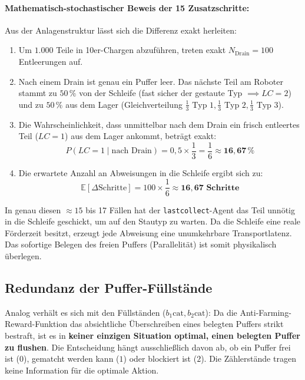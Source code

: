 \documentclass[11pt,a4paper]{article}
\begin{document}
\paragraph{Mathematisch-stochastischer Beweis der 15 Zusatzschritte:}
Aus der Anlagenstruktur lässt sich die Differenz exakt herleiten:
\begin{enumerate}
  \item Um $1.000$ Teile in 10er-Chargen abzuführen, treten exakt $N_{\text{Drain}} = 100$ Entleerungen auf.
  \item Nach einem Drain ist genau ein Puffer leer. Das nächste Teil am Roboter stammt zu $50\,\%$ von der Schleife (fast sicher der gestaute Typ $\implies LC=2$) und zu $50\,\%$ aus dem Lager (Gleichverteilung $\frac{1}{3} \text{ Typ 1}, \frac{1}{3} \text{ Typ 2}, \frac{1}{3} \text{ Typ 3}$).
  \item Die Wahrscheinlichkeit, dass unmittelbar nach dem Drain ein frisch entleertes Teil ($LC=1$) aus dem Lager ankommt, beträgt exakt:
  \[
    P(LC=1 \mid \text{nach Drain}) = 0{,}5 \times \frac{1}{3} = \frac{1}{6} \approx \mathbf{16{,}67\,\%}
  \]
  \item Die erwartete Anzahl an Abweisungen in die Schleife ergibt sich zu:
  \[
    \mathbb{E}[\Delta \text{Schritte}] = 100 \times \frac{1}{6} \approx \mathbf{16{,}67 \text{ Schritte}}
  \]
\end{enumerate}
In genau diesen $\approx 15$ bis 17 Fällen hat der \texttt{lastcollect}-Agent das Teil unnötig in die Schleife geschickt, um auf den Stautyp zu warten. Da die Schleife eine reale Förderzeit besitzt, erzeugt jede Abweisung eine unumkehrbare Transportlatenz. Das sofortige Belegen des freien Puffers (Parallelität) ist somit physikalisch überlegen. 

\begin{center}
\end{center}

\subsection{Redundanz der Puffer-Füllstände}
Analog verhält es sich mit den Füllständen ($b_1\text{cat}, b_2\text{cat}$): Da die Anti-Farming-Reward-Funktion das absichtliche Überschreiben eines belegten Puffers strikt bestraft, ist es in \textbf{keiner einzigen Situation optimal, einen belegten Puffer zu flushen}. Die Entscheidung hängt ausschließlich davon ab, ob ein Puffer frei ist ($0$), gematcht werden kann ($1$) oder blockiert ist ($2$). Die Zählerstände tragen keine Information für die optimale Aktion.
\end{document}
